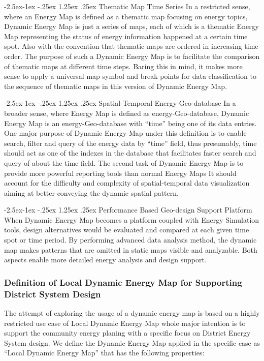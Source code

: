 \documentclass[hidelinks,12pt]{article}
\makeatletter
\renewcommand\paragraph{\@startsection{paragraph}{4}{\z@}%
            {-2.5ex\@plus -1ex \@minus -.25ex}%
            {1.25ex \@plus .25ex}%
            {\normalfont\normalsize\bfseries}}
\makeatother
\begin{document}
\paragraph{Thematic Map Time Series}
In a restricted sense, where an Energy Map is defined as a thematic
map focusing on energy topics, Dynamic Energy Map is just a series of
maps, each of which is a thematic Energy Map representing the status
of energy information happened at a certain time spot. Also with the
convention that thematic maps are ordered in increasing time order.
The purpose of such a Dynamic Energy Map is to facilitate the
comparison of thematic maps at different time steps. Baring this in
mind, it makes more sense to apply a universal map symbol and break
points for data classification to the sequence of thematic maps in
this version of Dynamic Energy Map.

\paragraph{Spatial-Temporal Energy-Geo-database}
In a broader sense, where Energy Map is defined as
energy-Geo-database, Dynamic Energy Map is an energy-Geo-database with
``time'' being one of its data entries. One major purpose of Dynamic
Energy Map under this definition is to enable search, filter and query
of the energy data by ``time'' field, thus presumably, time should act
as one of the indexes in the database that facilitates faster search
and query of about the time field. The second task of Dynamic Energy
Map is to provide more powerful reporting tools than normal Energy
Maps It should account for the difficulty and complexity of
spatial-temporal data visualization aiming at better conveying the
dynamic spatial pattern.

\paragraph{Performance Based Geo-design Support Platform}
When Dynamic Energy Map becomes a platform coupled with Energy
Simulation tools, design alternatives would be evaluated and compared
at each given time spot or time period. By performing advanced data
analysis method, the dynamic map makes patterns that are omitted in
static maps visible and analyzable. Both aspects enable more detailed
energy analysis and design support.

\subsubsection{Definition of Local Dynamic Energy Map for Supporting
  District System Design}
The attempt of exploring the usage of a dynamic energy map is based on
a highly restricted use case of Local Dynamic Energy Map whole major
intention is to support the community energy planing with a specific
focus on District Energy System design. We define the Dynamic Energy
Map applied in the specific case as ``Local Dynamic Energy Map'' that
has the following properties:
\end{document}
